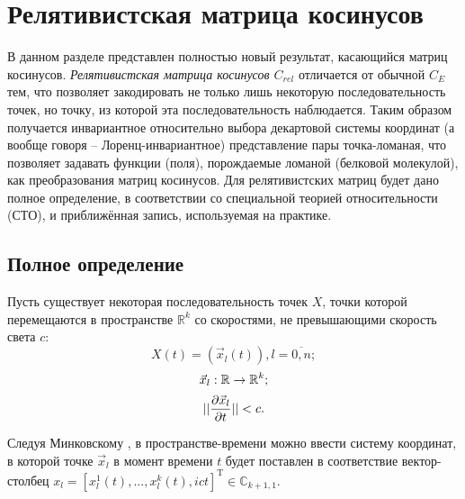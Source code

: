 

\section{Релятивистская матрица косинусов}

В данном разделе представлен полностью новый результат, касающийся матриц косинусов. \textit{Релятивистская матрица косинусов $C_{rel}$} отличается от обычной $C_E$ тем, что позволяет закодировать не только лишь некоторую последовательность точек, но точку, из которой эта последовательность наблюдается. Таким образом получается инвариантное относительно выбора декартовой системы координат (а вообще говоря -- Лоренц-инвариантное) представление пары точка-ломаная, что позволяет задавать функции (поля), порождаемые ломаной (белковой молекулой), как преобразования матриц косинусов. Для релятивистских матриц будет дано полное определение, в соответствии со специальной теорией относительности (СТО), и приближённая запись, используемая на практике.

\subsection{Полное определение}

Пусть существует некоторая последовательность точек $X$, точки которой перемещаются в пространстве $\mathbb{R}^{k}$ со скоростями, не превышающими скорость света $c$:
\begin{equation}
	X(t) = (\vec{x}_{l}(t)), l = \overline{0,n};
\end{equation}
\begin{equation}
	\vec{x}_l : \mathbb{R} \rightarrow \mathbb{R}^{k}; \notag
\end{equation}
\begin{equation}
	||\frac{\partial{\vec{x}_l}}{\partial{t}}|| < c. \notag
\end{equation}

Следуя Минковскому \cite{field_theory}, в пространстве-времени можно ввести систему координат, в которой точке $\vec{x}_l$ в момент времени $t$ будет поставлен в соответствие вектор-столбец $x_l = [x^1_l(t), ..., x^k_l(t), ict]^\mathrm{T} \in \mathbb{C}_{k+1,1}$.

